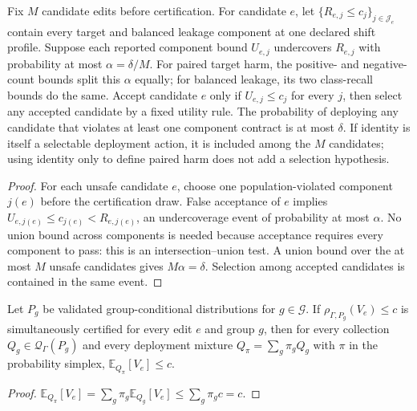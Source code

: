 \begin{theorem}
\label{thm:iut}
Fix $M$ candidate edits before certification. For candidate $e$, let
$\{R_{e,j}\leq c_j\}_{j\in\mathcal J_e}$ contain every target and balanced
leakage component at one declared shift profile. Suppose each reported
component bound $U_{e,j}$ undercovers $R_{e,j}$ with probability at most
$\alpha=\delta/M$. For paired target harm, the positive- and negative-count
bounds split this $\alpha$ equally; for balanced leakage, its two class-recall
bounds do the same. Accept candidate $e$ only if
$U_{e,j}\leq c_j$ for every $j$, then select any accepted candidate by a
fixed utility rule. The probability of deploying any candidate that violates
at least one component contract is at most $\delta$.
If identity is itself a selectable deployment action, it is included among the
$M$ candidates; using identity only to define paired harm does not add a
selection hypothesis.
\end{theorem}

\begin{proof}
For each unsafe candidate $e$, choose one population-violated component
$j(e)$ before the certification draw. False acceptance of $e$ implies
$U_{e,j(e)}\leq c_{j(e)}<R_{e,j(e)}$, an undercoverage event of probability at
most $\alpha$. No union bound across components is needed because acceptance
requires every component to pass: this is an intersection--union test. A union
bound over the at most $M$ unsafe candidates gives $M\alpha=\delta$.
Selection among accepted candidates is contained in the same event.
\end{proof}

\begin{corollary}
\label{cor:mixture}
Let $P_g$ be validated group-conditional distributions for
$g\in\mathcal{G}$. If
$\rho_{\Gamma,P_g}(V_e)\leq c$ is simultaneously certified for every edit
$e$ and group $g$, then for every collection
$Q_g\in\mathcal{Q}_{\Gamma}(P_g)$ and every deployment mixture
$Q_{\pi}=\sum_g\pi_gQ_g$ with $\pi$ in the probability simplex,
$\mathbb{E}_{Q_{\pi}}[V_e]\leq c$.
\end{corollary}

\begin{proof}
$\mathbb{E}_{Q_{\pi}}[V_e]=\sum_g\pi_g\mathbb{E}_{Q_g}[V_e]\leq
\sum_g\pi_gc=c$.
\end{proof}

